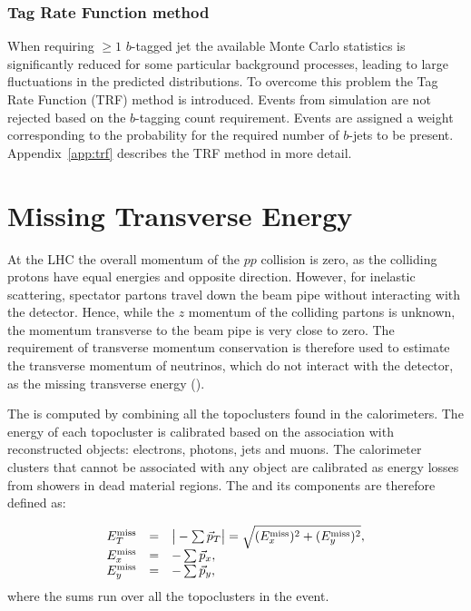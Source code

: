 \subsubsection{Tag Rate Function method}
\label{sec:trf}

When requiring $\geq 1$ $b$-tagged jet the available Monte Carlo
statistics is significantly reduced for some particular background
processes, leading to large fluctuations in the predicted distributions.
To overcome this problem the Tag Rate Function (TRF) method is introduced.
Events from simulation are not rejected based on the $b$-tagging count
requirement. Events are assigned a weight corresponding to the
probability for the required number of $b$-jets to be present.
Appendix~\ref{app:trf} describes the TRF method in more detail.

\section{Missing Transverse Energy}
\label{sec:met}

At the LHC the overall momentum of the $pp$ collision is zero, as the
colliding protons have equal energies and opposite direction. 
However, for inelastic scattering, spectator partons travel down the
beam pipe without interacting with the detector. Hence, while the $z$
momentum of the colliding partons is unknown, the momentum transverse
to the beam pipe is very close to zero. The requirement of transverse
momentum conservation is therefore used to estimate the transverse
momentum of neutrinos, which do not interact with the detector, as the
missing transverse energy (\met{}).  

The \met{} is computed by combining all the topoclusters found in the
calorimeters. The energy of each topocluster is calibrated based on
the association with reconstructed objects: electrons, photons, jets
and muons. The calorimeter clusters that cannot be associated with any
object are calibrated as energy losses from showers in dead material
regions. The \met{} and its components are therefore defined as:

\begin{equation}\label{eq:met}
\begin{array}{lcl}
E^{\rm miss}_{T} & = & \big|-\sum\vec{p}_T \big| = \sqrt{(E^{\rm miss}_{x})^2 + (E^{\rm miss}_{y})^2} ,\\
E^{\rm miss}_{x} & = & -\sum\vec{p}_x ,\\
E^{\rm miss}_{y} & = & -\sum\vec{p}_y ,\\
\end{array}	\end{equation}
where the sums run over all the topoclusters in the event.